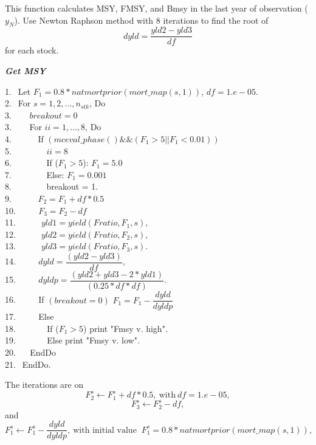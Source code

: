 \documentclass{article}
\begin{document}
This function calculates MSY, FMSY, and Bmsy in the last year of observation ($y_N$). 
Use Newton Raphson method with 8 iterations to find the root of
\begin{equation}
        dyld=\dfrac{yld2-yld3}{df}
    \end{equation}
    for each stock.\\
    \begin{algorithm}
	\caption{{\bf \textit{Get MSY}}}
	1.  $\  \ $Let $F_1=0.8*natmortprior(mort\_map(s,1))$, $df=1.e-05$. \\
	2.  $\  \ $For $s=1,2,...,n_{stk}$, Do\\
    3.  $\  \ \quad$  $breakout=0$\\
    3.  $\  \ \quad$ For $ii=1,...,8$, Do \\
	4.  $\  \ \qquad$ If $(mceval\_phase()\&\&(F_1>5||F_1< 0.01)) $\\
	5.  $\  \ \qquad$$\quad$ $ii=8$\\
	6.  $\  \ \qquad$$\quad$  If ($F_1>5$): $F_1=5.0$\\
	7.  $\  \ \qquad$$\quad$   Else: $F_1=0.001$\\
	8.  $\  \ \qquad$$\quad$   breakout = 1. \\
	9.  $\  \ \qquad$   $F_2 = F_1+df*0.5$\\
	10. $\qquad$  $F_3 = F_2 -df$\\
	11. $\quad$ $\quad$  $yld1 = yield(Fratio, F_1,s),$\\
    12. $\quad$ $\quad$  $yld2=yield(Fratio,F_2,s),$\\
    13. $\quad$ $\quad$  $yld3=yield(Fratio,F_3,s).$\\
    14. $\quad$$\quad$   $dyld=\dfrac{(yld2-yld3)}{df},$\\
    15. $\quad$$\quad$   $dyldp=\dfrac{(yld2+yld3-2*yld1)}{(0.25*df*df)}$.\\
    16. $\quad$$\quad$   If $(breakout=0)$ $F_1=F_{1}-\dfrac{dyld}{dyldp}$\\
    17. $\quad$$\quad$   Else \\
    18. $\qquad$$\quad$   If ($F_1>5$) print "Fmsy v. high". \\
    19. $\qquad$$\quad$   Else print "Fmsy v. low". \\
    20. $\quad$ EndDo\\
    21. $\  \ $EndDo.
    
\end{algorithm}

    The iterations are on
    \begin{equation}
        F_2^s \leftarrow F_1^s + df*0.5, \ \text{with}  \ df=1.e-05,
    \end{equation}
    \begin{equation}
        F_3^s\leftarrow F_2^s-df,
    \end{equation}
and
\begin{equation}
    F_1^s\leftarrow F_1^s-\dfrac{dyld}{dyldp}, \ \text{with initial value } \ F_1^s=0.8*natmortprior(mort\_map(s,1)),
\end{equation}
\end{document}
